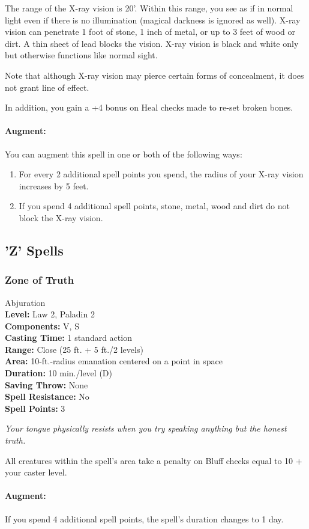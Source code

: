 The range of the X-ray vision is 20'. Within this range, you see as if in normal light even if there is no illumination (magical darkness is ignored as well). X-ray vision can penetrate 1 foot of stone, 1 inch of metal, or up to 3 feet of wood or dirt. A thin sheet of lead blocks the vision.
X-ray vision is black and white only but otherwise functions like normal sight.

Note that although X-ray vision may pierce certain forms of concealment, it does not grant line of effect.

In addition, you gain a +4 bonus on Heal checks made to re-set broken bones.

\paragraph{Augment:} You can augment this spell in one or both of the following ways:
\begin{enumerate}
 \item For every 2 additional spell points you spend, the radius of your X-ray vision increases by 5 feet.
 \item If you spend 4 additional spell points, stone, metal, wood and dirt do not block the X-ray vision. 
\end{enumerate}

\subsection{'Z' Spells}
\subsubsection{Zone of Truth}
\label{Spell:ZoneOfTruth}
Abjuration
\\ \textbf{Level:} Law 2, Paladin 2
\\ \textbf{Components:} V, S
\\ \textbf{Casting Time:} 1 standard action
\\ \textbf{Range:} Close (25 ft. + 5 ft./2 levels)
\\ \textbf{Area:} 10-ft.-radius emanation centered on a point in space
\\ \textbf{Duration:} 10 min./level (D)
\\ \textbf{Saving Throw:} None
\\ \textbf{Spell Resistance:} No
\\ \textbf{Spell Points:} 3

\emph{Your tongue physically resists when you try speaking anything but the honest truth.}

All creatures within the spell's area take a penalty on Bluff checks equal to 10 + your caster level.

\paragraph{Augment:} If you spend 4 additional spell points, the spell's duration changes to 1 day.

